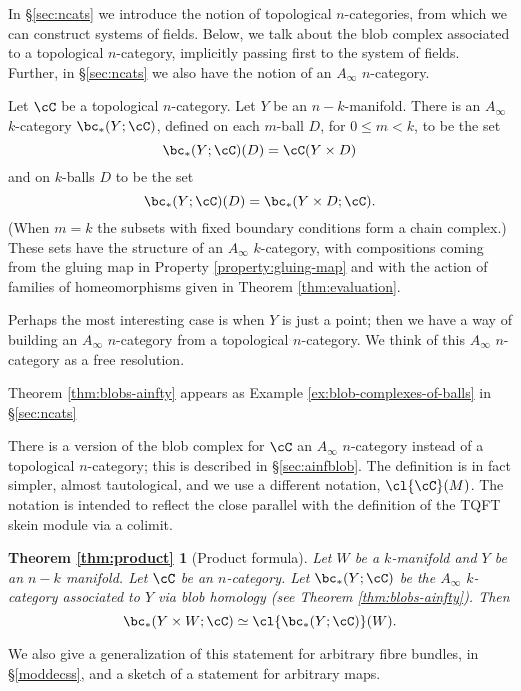 In \S \ref{sec:ncats} we introduce the notion of topological $n$-categories, from which we can construct systems of fields.
Below, we talk about the blob complex associated to a topological $n$-category, implicitly passing first to the system of fields.
Further, in \S \ref{sec:ncats} we also have the notion of an $A_\infty$ $n$-category.

\begin{thm}
\label{thm:blobs-ainfty}
Let $\cC$ be  a topological $n$-category.
Let $Y$ be an $n{-}k$-manifold. 
There is an $A_\infty$ $k$-category $\bc_*(Y;\cC)$, defined on each $m$-ball $D$, for $0 \leq m < k$, 
to be the set $$\bc_*(Y;\cC)(D) = \cC(Y \times D)$$ and on $k$-balls $D$ to be the set 
$$\bc_*(Y;\cC)(D) = \bc_*(Y \times D; \cC).$$ 
(When $m=k$ the subsets with fixed boundary conditions form a chain complex.) 
These sets have the structure of an $A_\infty$ $k$-category, with compositions coming from the gluing map in 
Property \ref{property:gluing-map} and with the action of families of homeomorphisms given in Theorem \ref{thm:evaluation}.
\end{thm}
\begin{rem}
Perhaps the most interesting case is when $Y$ is just a point; then we have a way of building an $A_\infty$ $n$-category from a topological $n$-category.
We think of this $A_\infty$ $n$-category as a free resolution.
\end{rem}
Theorem \ref{thm:blobs-ainfty} appears as Example \ref{ex:blob-complexes-of-balls} in \S \ref{sec:ncats}

There is a version of the blob complex for $\cC$ an $A_\infty$ $n$-category
instead of a topological $n$-category; this is described in \S \ref{sec:ainfblob}.
The definition is in fact simpler, almost tautological, and we use a different notation, $\cl{\cC}(M)$. The notation is intended to reflect the close parallel with the definition of the TQFT skein module via a colimit.

\newtheorem*{thm:product}{Theorem \ref{thm:product}}

\begin{thm:product}[Product formula]
Let $W$ be a $k$-manifold and $Y$ be an $n-k$ manifold.
Let $\cC$ be an $n$-category.
Let $\bc_*(Y;\cC)$ be the $A_\infty$ $k$-category associated to $Y$ via blob homology (see Theorem \ref{thm:blobs-ainfty}).
Then
\[
	\bc_*(Y\times W; \cC) \simeq \cl{\bc_*(Y;\cC)}(W).
\]
\end{thm:product}
We also give a generalization of this statement for arbitrary fibre bundles, in \S \ref{moddecss}, and a sketch of a statement for arbitrary maps.

